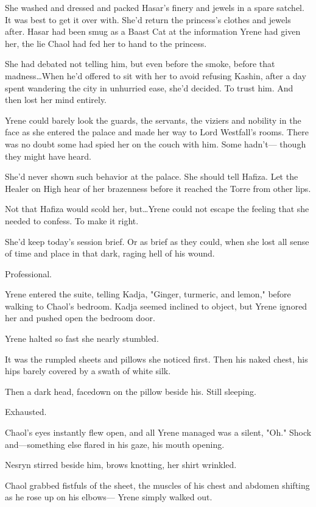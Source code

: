 She washed and dressed and packed Hasar's finery and jewels in a spare satchel.
It was best to get it over with.
She'd return the princess's clothes and jewels after.
Hasar had been smug as a Baast Cat at the information Yrene had given her, the lie Chaol had fed her to hand to the princess.

She had debated not telling him, but even before the smoke, before that madness\ldots When he'd offered to sit with her to avoid refusing Kashin, after a day spent wandering the city in unhurried ease, she'd decided.
To trust him.
And then lost her mind entirely.

Yrene could barely look the guards, the servants, the viziers and nobility in the face as she entered the palace and made her way to Lord Westfall's rooms.
There was no doubt some had spied her on the couch with him.
Some hadn't--- though they might have heard.

She'd never shown such behavior at the palace.
She should tell Hafiza.
Let the Healer on High hear of her brazenness before it reached the Torre from other lips.

Not that Hafiza would scold her, but\ldots Yrene could not escape the feeling that she needed to confess.
To make it right.

She'd keep today's session brief.
Or as brief as they could, when she lost all sense of time and place in that dark, raging hell of his wound.

Professional.

Yrene entered the suite, telling Kadja, "Ginger, turmeric, and lemon," before walking to Chaol's bedroom.
Kadja seemed inclined to object, but Yrene ignored her and pushed open the bedroom door.

Yrene halted so fast she nearly stumbled.

It was the rumpled sheets and pillows she noticed first.
Then his naked chest, his hips barely covered by a swath of white silk.

Then a dark head, facedown on the pillow beside his.
Still sleeping.

Exhausted.

Chaol's eyes instantly flew open, and all Yrene managed was a silent, "Oh."
Shock and---something else flared in his gaze, his mouth opening.

Nesryn stirred beside him, brows knotting, her shirt wrinkled.

Chaol grabbed fistfuls of the sheet, the muscles of his chest and abdomen shifting as he rose up on his elbows--- Yrene simply walked out.

